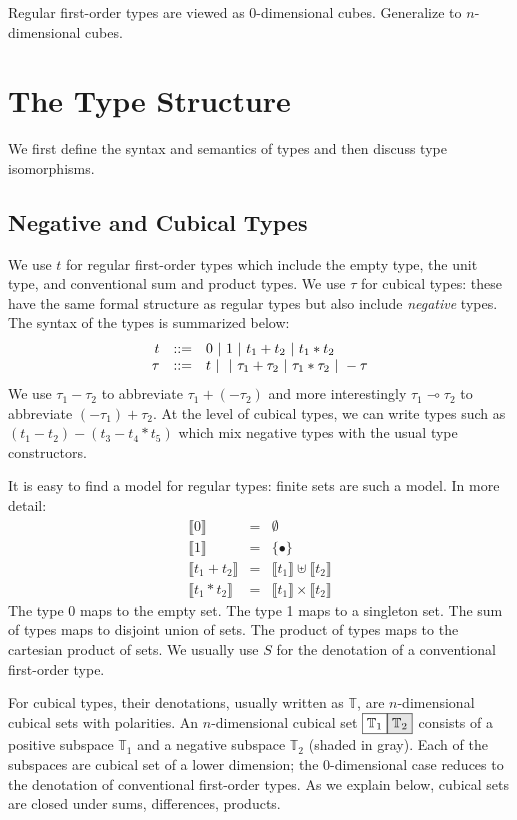 \documentclass[authoryear,preprint]{sigplanconf}
\newcommand{\lolli}{\multimap}
\newcommand{\cubt}{\mathbb{T}}
\newcommand{\den}[1]{\llbracket #1 \rrbracket}
\newcommand{\nodet}[2]{\fcolorbox{black}{white}{$#1$}\fcolorbox{black}{gray!20}{$#2$}}
\begin{document}
Regular first-order types are viewed as 0-dimensional cubes. Generalize to
$n$-dimensional cubes. 

\section{The Type Structure}

We first define the syntax and semantics of types and then discuss type
isomorphisms.

\subsection{Negative and Cubical Types}

We use $t$ for regular first-order types which include the empty type, the
unit type, and conventional sum and product types.  We use $\tau$ for cubical
types: these have the same formal structure as regular types but also include
\emph{negative} types. The syntax of the types is summarized below:
\[\begin{array}{rcl}
t &::=& 0 ~|~ 1 ~|~ t_1 + t_2 ~|~ t_1 * t_2 \\
\tau &::=& t ~|~ 
      ~|~ \tau_1 + \tau_2
      ~|~ \tau_1 * \tau_2
      ~|~ - \tau
\end{array}\]
We use $\tau_1 - \tau_2$ to abbreviate $\tau_1 + (- \tau_2)$ and more
interestingly $\tau_1 \lolli \tau_2$ to abbreviate $(- \tau_1) + \tau_2$. At
the level of cubical types, we can write types such as
$(t_1-t_2)-(t_3-t_4*t_5)$ which mix negative types with the usual type
constructors.

It is easy to find a model for regular types: finite sets are such a
model. In more detail:
\[\begin{array}{rcl}
\den{0} &=& \emptyset \\
\den{1} &=& \{ \bullet \} \\
\den{t_1 + t_2} &=& \den{t_1} \uplus \den{t_2} \\
\den{t_1 * t_2} &=& \den{t_1} \times \den{t_2} 
\end{array}\]
The type 0 maps to the empty set. The type 1 maps to a singleton set. The sum
of types maps to disjoint union of sets. The product of types maps to the
cartesian product of sets. We usually use $S$ for the denotation of a
conventional first-order type.

For cubical types, their denotations, usually written as $\cubt$, are
$n$-dimensional cubical sets with polarities. An $n$-dimensional cubical set
$\nodet{\cubt_1}{\cubt_2}$ consists of a positive subspace $\cubt_1$ and a
negative subspace $\cubt_2$ (shaded in gray). Each of the subspaces are
cubical set of a lower dimension; the 0-dimensional case reduces to the
denotation of conventional first-order types. As we explain below, cubical
sets are closed under sums, differences, products.
\end{document}
